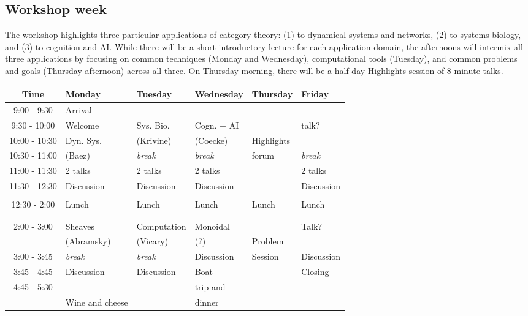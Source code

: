 \documentclass{article}
\newcommand{\redout}[1]{{\color{red}#1}}
\begin{document}
\subsection{Workshop week}
The workshop highlights three particular applications of category theory: (1) to dynamical systems and networks, (2) to systems biology, and (3) to cognition and AI. While there will be a short introductory lecture for each application domain, the afternoons will intermix all three applications by focusing on common techniques (Monday and Wednesday), computational tools (Tuesday), and common problems and goals (Thursday afternoon) across all three. On Thursday morning, there will be a half-day Highlights session of 8-minute talks.

\begin{table}[h!]
\begin{center}
\begin{tabular}{|c||p{.15\linewidth}|p{.15\linewidth}|p{.15\linewidth}|p{.15\linewidth}|p{.15\linewidth}|}
\hline
Time & Monday & Tuesday & Wednesday & Thursday & Friday \\ \hline
9:00 - 9:30 & Arrival & & & & \\ \cline{2-4} \cline{6-6}
9:30 - 10:00 & Welcome & Sys. Bio. & Cogn. + AI &  & \redout{talk?} \\ \cline{2-2}
10:00 - 10:30 & Dyn. Sys. & (Krivine)  & (Coecke) & Highlights & \\ \cline{3-4} \cline{6-6}
10:30 - 11:00 & (Baez) & \emph{break} & \emph{break} & forum & \emph{break} \\  \cline{2-4} \cline{6-6}
11:00 - 11:30 & 2 talks & 2 talks & 2 talks & & 2 talks \\ \cline{2-4} \cline{6-6}
11:30 - 12:30 & Discussion & Discussion & Discussion & & Discussion \\ 
&&&&& \\\hline
12:30 - 2:00 & Lunch & Lunch & Lunch & Lunch & Lunch \\
&&&&& \\
&&&&& \\ \hline
2:00 - 3:00 & Sheaves & Computation & Monoidal & & \redout{Talk?} \\
& (Abramsky) & (Vicary) & (?) & Problem & \\ \cline{2-4} \cline{6-6}
3:00 - 3:45 & \emph{break} & \emph{break} & Discussion & Session & Discussion \\ \cline{2-4} \cline{6-6}
3:45 - 4:45 & Discussion & Discussion & Boat & & Closing \\ 
4:45 - 5:30 & & & trip and & & \\ \cline{2-3} \cline{5-6}
& Wine and cheese & & dinner & &  \\ \hline
\end{tabular}
\end{center}
\end{table}%
\end{document}
